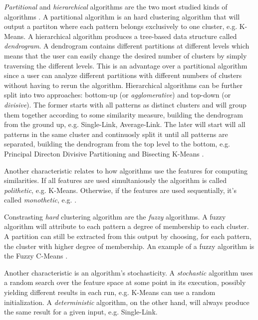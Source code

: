 \emph{Partitional} and \emph{hierarchical} algorithms are the two most studied kinds of algorithms \cite{Aggarwal2014}.
A partitional algorithm is an hard clustering algorithm that will output a partiton where each pattern belongs exclusively to one cluster, e.g. K-Means.
A hierarchical algorithm produces a tree-based data structure called \emph{dendrogram}.
A dendrogram contains different partitions at different levels which means that the user can easily change the desired number of clusters by simply traversing the different levels.
This is an advantage over a partitional algorithm since a user can analyze different partitions with different numbers of clusters without having to rerun the algorithm.
Hierarchical algorithms can be further split into two approaches: bottom-up (or \emph{agglomerative}) and top-down (or \emph{divisive}).
The former starts with all patterns as distinct clusters and will group them together according to some similarity measure, building the dendrogram from the ground up, e.g. Single-Link, Average-Link.
The later will start will all patterns in the same cluster and continuosly split it until all patterns are separated, building the dendrogram from the top level to the bottom, e.g. Principal Directon Divisive Partitioning\cite{Boley1998} and Bisecting K-Means \cite{Steinbach2000}.


Another characteristic relates to how algorithms use the features for computing similarities.
If all features are used simultaniously the algorithm is called \emph{polithetic}, e.g. K-Means.
Otherwise, if the features are used sequentially, it's called \emph{monothetic}, e.g. \cite{Chavent1998}.

Constrasting \emph{hard} clustering algorithm are the \emph{fuzzy} algorithms.
A fuzzy algorithm will attribute to each pattern a degree of membership to each cluster.
A partition can still be extracted from this output by choosing, for each pattern, the cluster with higher degree of membership.
An example of a fuzzy algorithm is the Fuzzy C-Means \cite{Bezdek1984}.

Another characteristic is an algorithm's stochasticity.
A \emph{stochastic} algorithm uses a random search over the feature space at some point in its execution, possibly yielding different results in each run, e.g. K-Means can use a random initialization.
A \emph{deterministic} algorithm, on the other hand, will always produce the same result for a given input, e.g. Single-Link.

